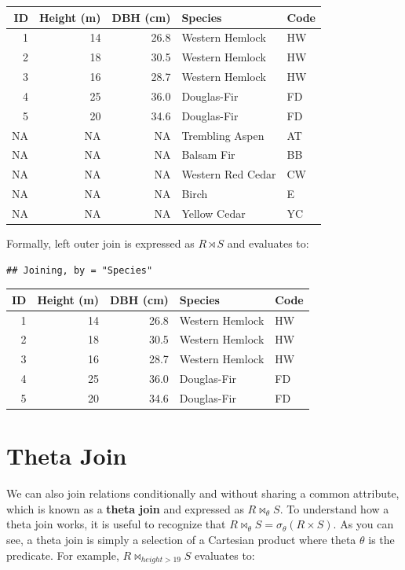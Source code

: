 \documentclass[
]{book}
\begin{document}
\begin{tabular}{rrrll}
\toprule
ID & Height (m) & DBH (cm) & Species & Code\\
\midrule
1 & 14 & 26.8 & Western Hemlock & HW\\
2 & 18 & 30.5 & Western Hemlock & HW\\
3 & 16 & 28.7 & Western Hemlock & HW\\
4 & 25 & 36.0 & Douglas-Fir & FD\\
5 & 20 & 34.6 & Douglas-Fir & FD\\
\addlinespace
NA & NA & NA & Trembling Aspen & AT\\
NA & NA & NA & Balsam Fir & BB\\
NA & NA & NA & Western Red Cedar & CW\\
NA & NA & NA & Birch & E\\
NA & NA & NA & Yellow Cedar & YC\\
\bottomrule
\end{tabular}

Formally, left outer join is expressed as \(R⋊S\) and evaluates to:

\begin{verbatim}
## Joining, by = "Species"
\end{verbatim}

\begin{tabular}{rrrll}
\toprule
ID & Height (m) & DBH (cm) & Species & Code\\
\midrule
1 & 14 & 26.8 & Western Hemlock & HW\\
2 & 18 & 30.5 & Western Hemlock & HW\\
3 & 16 & 28.7 & Western Hemlock & HW\\
4 & 25 & 36.0 & Douglas-Fir & FD\\
5 & 20 & 34.6 & Douglas-Fir & FD\\
\bottomrule
\end{tabular}

\hypertarget{theta-join}{%
\section{Theta Join}\label{theta-join}}

We can also join relations conditionally and without sharing a common attribute, which is known as a \textbf{theta join} and expressed as \(R⋈_θS\). To understand how a theta join works, it is useful to recognize that \(R⋈_θS=σ_{θ}(R×S)\). As you can see, a theta join is simply a selection of a Cartesian product where theta \(θ\) is the predicate. For example, \(R⋈_{height>19}S\) evaluates to:
\end{document}
